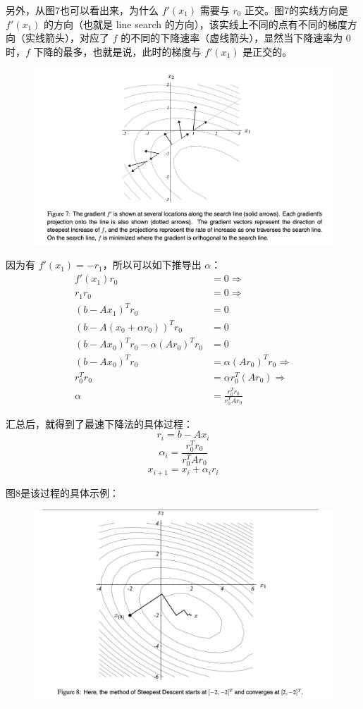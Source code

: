 \documentclass[12pt]{article}
\begin{document}
另外，从图7也可以看出来，为什么 $f'(x_1)$ 需要与 $r_0$ 正交。图7的实线方向是 $f'(x_1)$ 的方向（也就是 line search 的方向），该实线上不同的点有不同的梯度方向（实线箭头），对应了 $f$ 的不同的下降速率（虚线箭头），显然当下降速率为 0 时，$f$ 下降的最多，也就是说，此时的梯度与 $f'(x_1)$ 是正交的。
\begin{figure}[H]
    \centering
    \includegraphics[width=1\textwidth]{fig/CG_Plot_SD_2.png}
\end{figure}

因为有 $f'(x_1) = -r_1$，所以可以如下推导出 $\alpha$：
\begin{align*}
f'(x_1) r_0 &= 0 \Rightarrow \\
r_1 r_0 &= 0 \Rightarrow \\
(b - Ax_1)^T r_0 &= 0 \\
(b - A(x_0 + \alpha r_0))^T r_0 &= 0 \\
(b - Ax_0)^T r_0 - \alpha (A r_0)^T r_0 &= 0 \\
(b - Ax_0)^T r_0 &=  \alpha (A r_0)^T r_0 \Rightarrow \\
r^T_0 r_0 &= \alpha r^T_0(Ar_0) \Rightarrow \\
\alpha &= \frac{r^T_0 r_0 }{r^T_0 A r_0}
\end{align*}

汇总后，就得到了最速下降法的具体过程：
$$
r_i = b - Ax_i
$$
$$
\alpha_i = \frac{r^T_0 r_0 }{r^T_0 A r_0}
$$
$$
x_{i+1} = x_i + \alpha_i r_i
$$

图8是该过程的具体示例：
\begin{figure}[H]
    \centering
    \includegraphics[width=.8\textwidth]{fig/CG_Plot_SD_3.png}
\end{figure}
\end{document}
